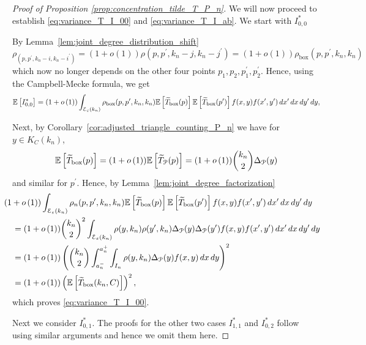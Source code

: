 \begin{proof}[Proof of Proposition \ref{prop:concentration_tilde_T_P_n}]
We will now proceed to establish \eqref{eq:variance_T_I_00} and \eqref{eq:variance_T_I_ab}. We start with $I_{0,0}^\ast$ 


By Lemma~\ref{lem:joint_degree_distribution_shift} 
\[
	\rho_(p,p^\prime, k_n-i,k_n-i^\prime) = (1+o(1))\rho(p,p^\prime, k_n-j,k_n-j^\prime) 
	= (1+o(1))\rho_{\text{box}}(p, p^\prime, k_n, k_n)
\]
which now no longer depends on the other four points $p_1, p_2, p_1^\prime, p_2^\prime$. Hence, using the Campbell-Mecke formula, we get
\[
	\mathbb{E}\left[I_{0,0}^\ast\right] = (1 + o\left(1\right))\int_{\mathcal{E}_{\varepsilon}(k_n)}\rho_{\text{box}}(p,p^\prime,k_n, k_n)
		\mathbb{E}\left[\widetilde{T}_{\text{box}}(p)\right]\mathbb{E}\left[\widetilde{T}_{\text{box}}(p^\prime)\right] f(x,y)
		f(x^\prime,y^\prime) \, dx^\prime \, dx \, dy^\prime \, dy,
\]

Next, by Corollary~\ref{cor:adjusted_triangle_counting_P_n} we have for $y \in K_C(k_n)$,
\[
	\mathbb{E}\left[\widetilde{T}_{\text{box}}(p)\right] = (1+o\left(1\right))\mathbb{E}\left[\widetilde{T}_{{\mathcal P}}(p)\right] = (1 + o\left(1\right)) \binom{k_n}{2} \Delta_{{\mathcal P}}(y)
\] 
and similar for $p^\prime$. Hence, by Lemma~\ref{lem:joint_degree_factorization} 
\begin{align*}
	&\hspace{-10pt}(1 + \smallO{1})\int_{\mathcal{E}_\varepsilon(k_n)} \rho_n(p, p^\prime, k_n, k_n)
		\Exp{\widetilde{T}_{\text{box}}(p)}\Exp{\widetilde{T}_{\text{box}}(p^\prime)} f(x,y)
		f(x^\prime,y^\prime) \, dx^\prime \, dx \, dy^\prime \, dy\\
	&= (1+\smallO{1})\binom{k_n}{2}^2 \int_{\mathcal{E}_\varepsilon(k_n)} 
		\rho(y, k_n) \rho(y^\prime, k_n) \Delta_{\Pcal}(y) \Delta_\Pcal(y^\prime) 	f(x,y) 
		f(x^\prime,y^\prime) \, dx^\prime \, dx \, dy^\prime \, dy\\
	&= (1+\smallO{1}) \left( \binom{k_n}{2} \int_{a_n^-}^{a_n^+}\int_{I_n} \rho(y,k_n)
		\Delta_{\Pcal}(y) f(x,y) \, dx \, dy\right)^2\\
	&= (1 + \smallO{1})\left(\Exp{\widetilde{T}_{\text{box}}(k_n,C)}\right)^2,
\end{align*}
which proves \eqref{eq:variance_T_I_00}.

Next we consider $I_{0,1}^\ast$. The proofs for the other two cases $I_{1,1}^\ast$ and $I_{0,2}^\ast$ follow using similar arguments and hence we omit them here.


\end{proof}
